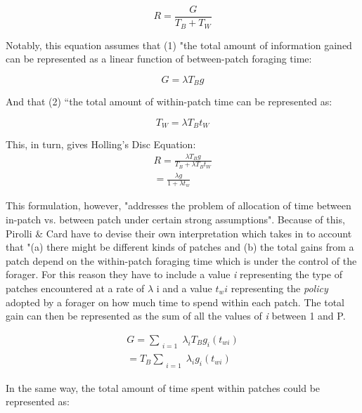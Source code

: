 \documentclass{mproj}
\begin{document}
\begin{equation}
R = \frac{G}{T_B + T_W}
\label {eq:main}
\end{equation}

Notably, this equation assumes that (1) "the total amount of information gained can be represented as a linear function of between-patch foraging time:

\begin{equation}
G = \lambda T_B g
\end{equation}

And that (2) “the total amount of within-patch time can be represented as:

\begin{equation}
T_W = \lambda T_B t_W
\end{equation}

This, in turn, gives Holling's Disc Equation:
\begin{equation}
\begin{split}
 R = \frac{\lambda T_B g}{T_B + \lambda T_B t_W} \\
= \frac{\lambda g}{1 + \lambda t_w}
\end{split}
\end{equation}

This formulation, however, "addresses the problem of allocation of time between in-patch vs. between patch under certain strong assumptions". Because of this, Pirolli \& Card have to devise their own interpretation which takes in to account that "(a) there might be different kinds of patches and (b) the total gains from a patch depend on the within-patch foraging time which is under the control of the forager. For this reason they have to include a value \emph{i} representing the type of patches encountered at a rate of $\lambda$ i and a value $t_wi$ representing the \emph {policy} adopted by a forager on how much time to spend within each patch. The total gain can then be represented as the sum of all the values of \emph{i} between 1 and P.

\begin{equation}
\begin{split}
G = \sum_{\substack{i=1}} \lambda_i T_B g_i (t_{wi}) \\
= T_B  \sum_{\substack{i=1}} \lambda_i g_i (t_{wi})
\end{split}
\end{equation}

In the same way, the total amount of time spent within patches could be represented as:
\end{document}
